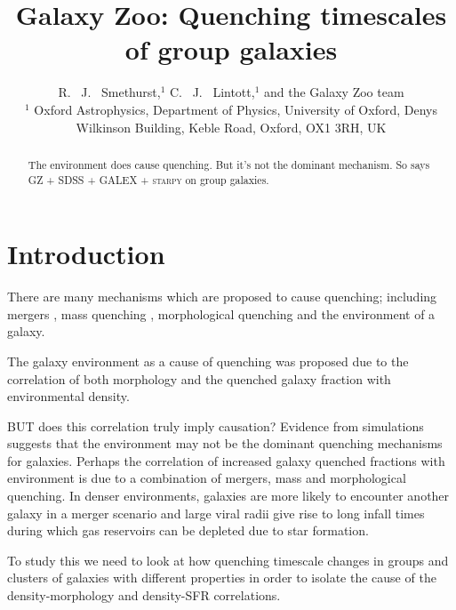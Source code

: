 \documentclass[useAMS,usenatbib]{mn2e}
\def\starpy ~{\textsc{starpy}}
\begin{document}
\title[Environmental quenching: yay or nay?]{Galaxy Zoo: Quenching timescales of group galaxies}
\author[Smethurst et al. 2015]{R. ~J. ~Smethurst,$^{1}$ C. ~J. ~Lintott,$^{1}$ and the Galaxy Zoo team \footnotemark[1]
\\ $^1$ Oxford Astrophysics, Department of Physics, University of Oxford, Denys Wilkinson Building, Keble Road, Oxford, OX1 3RH, UK 
}

\maketitle

\begin{abstract}
The environment does cause quenching. But it's not the dominant mechanism. So says GZ + SDSS + GALEX + \starpy~ on group galaxies. 
\end{abstract}


\section{Introduction}\label{sec:intro}
 
 There are many mechanisms which are proposed to cause quenching; including mergers \citep{daddi10}, mass quenching \citep{kennicutt77, peng12}, morphological quenching \citep{faber12} and the environment of a galaxy.
 
 The galaxy environment as a cause of quenching was proposed due to the correlation of both morphology \citep{dressler80} and the quenched galaxy fraction \citep{?} with environmental density. 
 
 BUT does this correlation truly imply causation? Evidence from simulations \citep{?} suggests that the environment may not be the dominant quenching mechanisms for galaxies. Perhaps the correlation of increased galaxy quenched fractions with environment is due to a combination of mergers, mass and morphological quenching. In denser environments, galaxies are more likely to encounter another galaxy in a merger scenario and large viral radii give rise to long infall times during which gas reservoirs can be depleted due to star formation.
 
 To study this we need to look at how quenching timescale changes in groups and clusters of galaxies with different properties in order to isolate the cause of the density-morphology and density-SFR correlations. 
 
\end{document}
